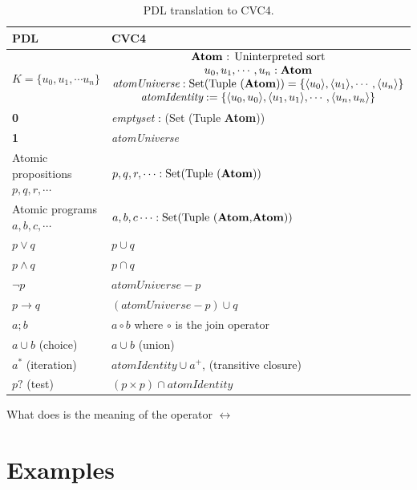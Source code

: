 \documentclass[12pt,a4paper]{article}
\begin{document}
\begin{table}
\begin{center}
\begin{tabular}{ll} 
\toprule
PDL & CVC4 \\    
\midrule    
$K=\lbrace u_0, u_1, \cdots u_n \rbrace$ &  
$\begin{matrix}
\text{\textbf{Atom} : \text{Uninterpreted sort}} \\
u_0, u_1, \cdots, u_n: \textbf{Atom} \\
\textit{atomUniverse}: \text{Set(Tuple (\textbf{Atom}))} = \lbrace \langle u_0 \rangle, \langle u_1 \rangle, \cdots , \langle u_n \rangle \rbrace \\
\textit{atomIdentity}:  = \lbrace \langle u_0, u_0 \rangle, \langle u_1, u_1 \rangle, \cdots , \langle u_n, u_n \rangle \rbrace \\
\end{matrix}$ \\ \midrule   
\textbf{0} & \textit{emptyset} : (Set (Tuple \textbf{Atom})) \\
\textbf{1} & \textit{atomUniverse} \\
Atomic propositions $p, q, r, \cdots$ & $p, q, r, \cdots : \text{Set(Tuple (\textbf{Atom}))}$ \\
Atomic programs $a, b, c, \cdots$ & $a, b, c \cdots : \text{Set(Tuple (\textbf{Atom}$,$\textbf{Atom}))}$ \\
$p \vee q$ & $p \cup q$ \\
$p \wedge q$ & $p \cap q$ \\
$\neg p$ & $\textit{atomUniverse} - p$ \\
$p \rightarrow q$ & $(\textit{atomUniverse}- p)\cup q$ \\
$a;b$ & $a \circ b$ where $\circ$ is the join operator\\
$a \cup b$ (choice) & $a \cup b$ (union)\\
$a^*$ (iteration) & $\textit{atomIdentity} \cup a^+$, (transitive closure)\\
$p?$ (test) & $(p \times p) \cap \textit{atomIdentity}$\\
\bottomrule
\end{tabular}
\end{center}
\caption{PDL translation to CVC4.} \label{tab:translation}
\end{table}

What does is the meaning of the operator $\leftrightarrow$

\section{Examples}
\end{document}
